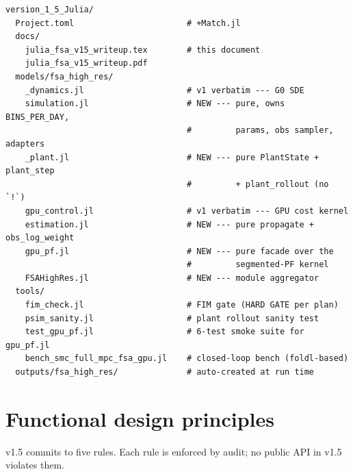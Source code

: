 \documentclass[11pt,a4paper]{article}
\begin{document}
\begin{verbatim}
version_1_5_Julia/
  Project.toml                       # +Match.jl
  docs/
    julia_fsa_v15_writeup.tex        # this document
    julia_fsa_v15_writeup.pdf
  models/fsa_high_res/
    _dynamics.jl                     # v1 verbatim --- G0 SDE
    simulation.jl                    # NEW --- pure, owns BINS_PER_DAY,
                                     #         params, obs sampler, adapters
    _plant.jl                        # NEW --- pure PlantState + plant_step
                                     #         + plant_rollout (no `!`)
    gpu_control.jl                   # v1 verbatim --- GPU cost kernel
    estimation.jl                    # NEW --- pure propagate + obs_log_weight
    gpu_pf.jl                        # NEW --- pure facade over the
                                     #         segmented-PF kernel
    FSAHighRes.jl                    # NEW --- module aggregator
  tools/
    fim_check.jl                     # FIM gate (HARD GATE per plan)
    psim_sanity.jl                   # plant rollout sanity test
    test_gpu_pf.jl                   # 6-test smoke suite for gpu_pf.jl
    bench_smc_full_mpc_fsa_gpu.jl    # closed-loop bench (foldl-based)
  outputs/fsa_high_res/              # auto-created at run time
\end{verbatim}

\section{Functional design principles}
\label{sec:functional}

v1.5 commits to five rules. Each rule is enforced by audit; no
public API in v1.5 violates them.
\end{document}
